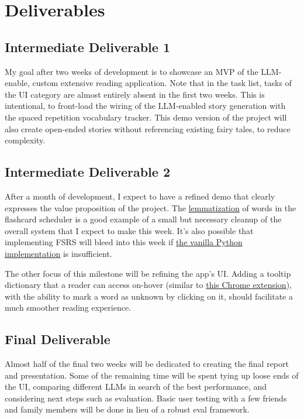 \documentclass[
	letterpaper, %
]{jdf}
\begin{document}
\section{Deliverables}
\subsection{Intermediate Deliverable 1}
My goal after two weeks of development is to showcase an MVP of the LLM-enable, custom extensive reading application. Note that in the task list, tasks of the UI category are almost entirely absent in the first two weeks. This is intentional, to front-load the wiring of the LLM-enabled story generation with the spaced repetition vocabulary tracker. This demo version of the project will also create open-ended stories without referencing existing fairy tales, to reduce complexity.

\subsection{Intermediate Deliverable 2}
After a month of development, I expect to have a refined demo that clearly expresses the value proposition of the project. The \href{https://www.techtarget.com/searchenterpriseai/definition/lemmatization#:~:text=The%20goal%20of%20lemmatization%20is,and%20contextual%20analysis%20of%20words.}{lemmatization} of words in the flashcard scheduler is a good example of a small but necessary cleanup of the overall system that I expect to make this week. It's also possible that implementing FSRS will bleed into this week if \href{https://pypi.org/project/fsrs/}{the vanilla Python implementation} is insufficient. 

The other focus of this milestone will be refining the app's UI. Adding a tooltip dictionary that a reader can access on-hover (similar to \href{https://chromewebstore.google.com/detail/hover-lookup/ogjdcbnhgjgabidifpnpiidgbkhlpnof?pli=1}{this Chrome extension}), with the ability to mark a word as unknown by clicking on it, should facilitate a much smoother reading experience.

\subsection{Final Deliverable}
Almost half of the final two weeks will be dedicated to creating the final report and presentation. Some of the remaining time will be spent tying up loose ends of the UI, comparing different LLMs in search of the best performance, and considering next steps such as evaluation. Basic user testing with a few friends and family members will be done in lieu of a robust eval framework.
\end{document}

